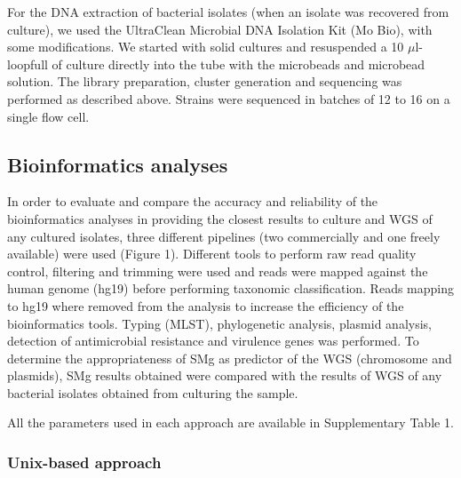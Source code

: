 For the DNA extraction of bacterial isolates (when an isolate was recovered from culture), we used the UltraClean Microbial DNA Isolation Kit (Mo Bio), with some modifications. 
We started with solid cultures and resuspended a 10 $\mu$l-loopfull of culture directly into the tube with the microbeads and microbead solution. 
The library preparation, cluster generation and sequencing was performed as described above. 
Strains were sequenced in batches of 12 to 16 on a single flow cell.

\subsection{Bioinformatics analyses} \label{ssec:sample_bioinformatics}

In order to evaluate and compare the accuracy and reliability of the bioinformatics analyses in providing the closest results to culture and WGS of any cultured isolates, three different pipelines (two commercially and one freely available) were used (Figure 1).
Different tools to perform raw read quality control, filtering and trimming were used and reads were mapped against the human genome (hg19) before performing taxonomic classification. 
Reads mapping to hg19 where removed from the analysis to increase the efficiency of the bioinformatics tools. 
Typing (MLST), phylogenetic analysis, plasmid analysis, detection of antimicrobial resistance and virulence genes was performed. 
To determine the appropriateness of SMg as predictor of the WGS (chromosome and plasmids), SMg results obtained were compared with the results of WGS of any bacterial isolates obtained from culturing the sample.

All the parameters used in each approach are available in Supplementary Table 1.

\subsubsection{Unix-based approach}

